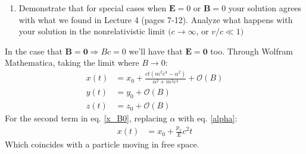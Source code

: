 \documentclass[]{article}
\numberwithin{equation}{section}
\newcommand{\0}{\textcolor{gray}{0}}
\begin{document}





\begin{enumerate}
	\item[\textbf{b.}] Demonstrate that for special cases when \(\mathbf{E} = 0\) or \(\mathbf{B} = 0\) your solution agrees with what we found in Lecture 4 (pages 7-12). Analyze what happens with your solution in the nonrelativistic limit \((c\rightarrow\infty\), or \(v/c \ll 1)\)
\end{enumerate}

In the case that \(\mathbf{B} = \mathbf{0} \Rightarrow Bc = 0\) we'll have that \(\mathbf{E} = \mathbf{0}\) too. Through Wolfram Mathematica, taking the limit where \(B \rightarrow 0\):
\begin{align}
	x(t) &= x_0 + \frac{c t \left(m^2 c^4 - \alpha ^2\right)}{\alpha ^2 + m^2 c^4} + \mathcal{O}\left(B\right)\label{x_B0}\\
	y(t) &= y_0 + \mathcal{O}\left(B\right)\\
	z(t) &= z_0 + \mathcal{O}\left(B\right)
\end{align}
For the second term in eq. \ref{x_B0}, replacing \(\alpha\) with eq. \ref{alpha}:
\begin{align*}
	x(t) &= x_0 + \frac{p_x}{E} c^2 t
\end{align*}
Which coincides with a particle moving in free space.
\end{document}
